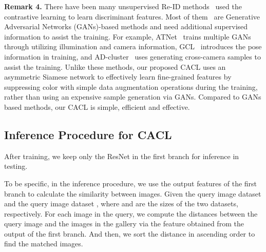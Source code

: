 \documentclass[journal]{IEEEtran}
\newcommand{\myparagraph}[1]{\noindent\textbf{#1.}}
\begin{document}
\myparagraph{Remark 4} There have been many unsupervised Re-ID methods~\cite{Ge:NIPS20,liu:CVPR19,zhai:CVPR20,chen:cvpr2021} used the contrastive learning to learn discriminant features. Most of them~\cite{liu:CVPR19,zhai:CVPR20,chen:cvpr2021} are Generative Adversarial Networks (GANs)-based methods and need additional supervised information to assist the training. 
For example, ATNet~\cite{liu:CVPR19} trains multiple GANs through utilizing illumination and camera information, GCL~\cite{chen:cvpr2021} introduces the pose information in training, and AD-cluster~\cite{zhai:CVPR20} uses generating cross-camera samples to assist the training. Unlike these methods, our proposed CACL uses an asymmetric Siamese network to effectively learn fine-grained features by suppressing color with simple data augmentation operations during the training, rather than using an expensive sample generation via GANs.  
Compared to GANs based methods, our CACL is simple, efficient and effective.

 







 
\subsection{Inference Procedure for CACL}
After training, we keep only the ResNet  in the first branch for inference in testing. 

To be specific, in the inference procedure, we use the output features  of the first branch  to calculate the similarity between images. Given the query image dataset  and the query image dataset , where  and  are the sizes of the two datasets, respectively. 
For each image  in the query, we compute the distances between the query image and the images in the gallery  via the feature obtained from the output of the first branch. And then, we sort the distance in ascending order to find the matched images.  
\end{document}
